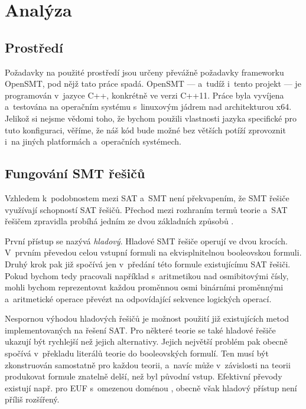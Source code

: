 \chapter{Analýza}

\section{Prostředí}

Požadavky na použité prostředí jsou určeny převážně požadavky frameworku OpenSMT, pod nějž tato práce spadá. OpenSMT --- a~tudíž i~tento projekt --- je programován v~jazyce C++, konkrétně ve verzi C++11. Práce byla vyvíjena a~testována na operačním systému s~linuxovým jádrem nad architekturou x64. Jelikož si nejsme vědomi toho, že bychom použili vlastnosti jazyka specifické pro tuto konfiguraci, věříme, že náš kód bude možné bez větších potíží zprovoznit i~na jiných platformách a~operačních systémech.

\section{Fungování SMT řešičů}\label{smt}

Vzhledem k~podobnostem mezi SAT a~SMT není překvapením, že SMT řešiče využívají schopností SAT řešičů. Přechod mezi rozhraním termů teorie a~SAT řešičem zpravidla probíhá jedním ze dvou základních způsobů \cite{Nieuwenhuis05}.

První přístup se nazývá \emph{hladový}. Hladové SMT řešiče operují ve dvou krocích. V~prvním převedou celou vstupní formuli na ekvisplnitelnou booleovskou formuli. Druhý krok pak již spočívá jen v~předání této formule existujícímu SAT řešiči. Pokud bychom tedy pracovali například s~aritmetikou nad osmibitovými čísly, mohli bychom reprezentovat každou proměnnou osmi binárními proměnnými a~aritmetické operace převézt na odpovídající sekvence logických operací.

Nespornou výhodou hladových řešičů je možnost použití již existujících metod implementovaných na řešení SAT. Pro některé teorie se také hladové řešiče ukazují být rychlejší než jejich alternativy. Jejich největší problém pak obecně spočívá v~překladu literálů teorie do booleovských formulí. Ten musí být zkonstruován samostatně pro každou teorii, a~navíc může v~závislosti na teorii produkovat formule znatelně delší, než byl původní vstup. Efektivní převody existují např. pro EUF s~omezenou doménou \cite{randal02}, obecně však hladový přístup není příliš rozšířený.

